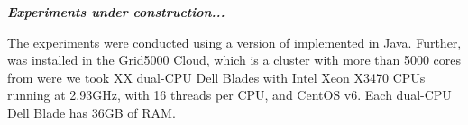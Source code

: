 \begin{center}
\textbf{\textit{Experiments under construction...}}
\end{center}

The experiments were conducted using a version of \toolname implemented in Java. Further, 
\toolname was installed in the Grid5000 Cloud, which is a cluster with more than 5000 cores from were we took XX dual-CPU Dell Blades with Intel Xeon X3470 CPUs running at 2.93GHz, with 16 threads 
per CPU, and CentOS v6. Each dual-CPU Dell Blade has 36GB of RAM. 




